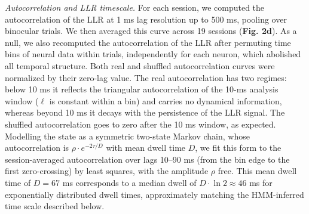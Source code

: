 \documentclass{article}
\begin{document}
\textit{Autocorrelation and LLR timescale.} For each session, we computed the autocorrelation of the LLR at 1 ms lag resolution up to 500 ms, pooling over binocular trials. We then averaged this curve across 19 sessions (\textbf{Fig. 2d}). As a null, we also recomputed the autocorrelation of the LLR after permuting time bins of neural data within trials, independently for each neuron, which abolished all temporal structure. Both real and shuffled autocorrelation curves were normalized by their zero-lag value. The real autocorrelation has two regimes: below 10 ms it reflects the triangular autocorrelation of the 10-ms analysis window ($\ell$ is constant within a bin) and carries no dynamical information, whereas beyond 10 ms it decays with the persistence of the LLR signal. The shuffled autocorrelation goes to zero after the 10 ms window, as expected. Modelling the state as a symmetric two-state Markov chain, whose autocorrelation is $\rho \cdot e^{-2\tau/D}$ with mean dwell time $D$, we fit this form to the session-averaged autocorrelation over lags 10--90 ms (from the bin edge to the first zero-crossing) by least squares, with the amplitude $\rho$ free. This mean dwell time of $D = 67$ ms corresponds to a median dwell of $D \cdot \ln 2 \approx 46$ ms for exponentially distributed dwell times, approximately matching the HMM-inferred time scale described below.
\end{document}
